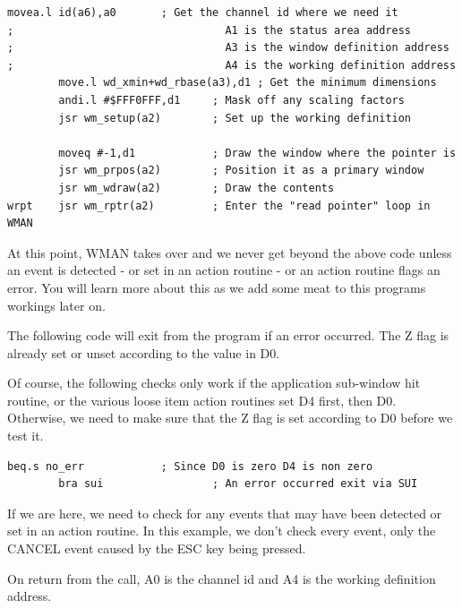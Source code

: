 \begin{lstlisting}[firstnumber=last,caption={ApplTest\_asm - Window Creation \& Display}]
        movea.l id(a6),a0       ; Get the channel id where we need it
;                                 A1 is the status area address
;                                 A3 is the window definition address
;                                 A4 is the working definition address
        move.l wd_xmin+wd_rbase(a3),d1 ; Get the minimum dimensions
        andi.l #$FFF0FFF,d1     ; Mask off any scaling factors
        jsr wm_setup(a2)        ; Set up the working definition

        moveq #-1,d1            ; Draw the window where the pointer is
        jsr wm_prpos(a2)        ; Position it as a primary window
        jsr wm_wdraw(a2)        ; Draw the contents
wrpt    jsr wm_rptr(a2)         ; Enter the "read pointer" loop in WMAN
\end{lstlisting}

At this point, WMAN takes over and we
    never get beyond the above code unless an event is detected -{} or set in an
    action routine -{} or an action routine flags an error. You will learn more
    about this as we add some meat to this programs workings later on.

The following code will exit from the program if an error occurred.
    The Z flag is already set or unset according to the value in D0.

\begin{note}
Of course, the following checks only work if the application sub-window hit routine, or the various loose item action routines set D4 first, then D0. Otherwise, we need to make sure that the Z flag is set according to D0 before we test it.
\end{note}

\begin{lstlisting}[firstnumber=last,caption={ApplTest\_asm - Error Handling},label={lst:ApplTestErrorHandling}]
        beq.s no_err            ; Since D0 is zero D4 is non zero
        bra sui                 ; An error occurred exit via SUI
\end{lstlisting}

If we are here, we need to check for any events that may have been
    detected or set in an action routine. In this example, we don't check
    every event, only the CANCEL event caused by the ESC key being
    pressed.

On return from the  call, A0 is the channel id and A4 is the
    working definition address.

